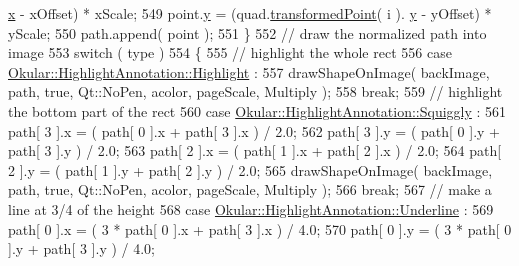 \begin{DoxyCode}
      \hyperlink{classOkular_1_1NormalizedPoint_a857f49b9bc7712430d167472ef9dbd94}{x} - xOffset) * xScale;
549                             point.\hyperlink{classOkular_1_1NormalizedPoint_ac2276daabda627d5f82bb1532c293047}{y} = (quad.\hyperlink{classOkular_1_1HighlightAnnotation_1_1Quad_acb6ab9f7ca3003937f7829941f5a0d52}{transformedPoint}( i ).
      \hyperlink{classOkular_1_1NormalizedPoint_ac2276daabda627d5f82bb1532c293047}{y} - yOffset) * yScale;
550                             path.append( point );
551                         \}
552                         \textcolor{comment}{// draw the normalized path into image}
553                         \textcolor{keywordflow}{switch} ( type )
554                         \{
555                             \textcolor{comment}{// highlight the whole rect}
556                             \textcolor{keywordflow}{case} \hyperlink{classOkular_1_1HighlightAnnotation_a63d2488735d1d6320e2e118743243999a250833fcd89a56dd46955dc287e1a3af}{Okular::HighlightAnnotation::Highlight}
      :
557                                 drawShapeOnImage( backImage, path, \textcolor{keyword}{true}, Qt::NoPen, acolor, pageScale, 
      Multiply );
558                                 \textcolor{keywordflow}{break};
559                             \textcolor{comment}{// highlight the bottom part of the rect}
560                             \textcolor{keywordflow}{case} \hyperlink{classOkular_1_1HighlightAnnotation_a63d2488735d1d6320e2e118743243999ad02aabccfaaea6082d9402b01e6ae9b8}{Okular::HighlightAnnotation::Squiggly}
      :
561                                 path[ 3 ].x = ( path[ 0 ].x + path[ 3 ].x ) / 2.0;
562                                 path[ 3 ].y = ( path[ 0 ].y + path[ 3 ].y ) / 2.0;
563                                 path[ 2 ].x = ( path[ 1 ].x + path[ 2 ].x ) / 2.0;
564                                 path[ 2 ].y = ( path[ 1 ].y + path[ 2 ].y ) / 2.0;
565                                 drawShapeOnImage( backImage, path, \textcolor{keyword}{true}, Qt::NoPen, acolor, pageScale, 
      Multiply );
566                                 \textcolor{keywordflow}{break};
567                             \textcolor{comment}{// make a line at 3/4 of the height}
568                             \textcolor{keywordflow}{case} \hyperlink{classOkular_1_1HighlightAnnotation_a63d2488735d1d6320e2e118743243999a1cb762e7ebfd92add9d8b71106e3fa2c}{Okular::HighlightAnnotation::Underline}
      :
569                                 path[ 0 ].x = ( 3 * path[ 0 ].x + path[ 3 ].x ) / 4.0;
570                                 path[ 0 ].y = ( 3 * path[ 0 ].y + path[ 3 ].y ) / 4.0;

\end{DoxyCode}
